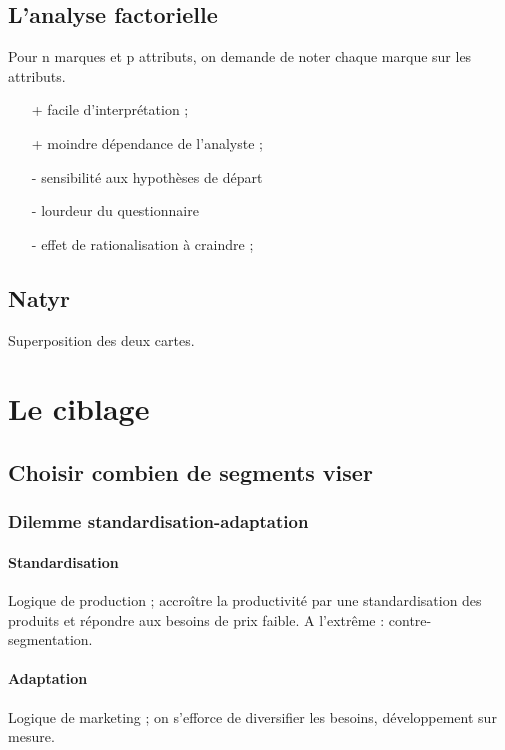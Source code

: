 		\subsection{L'analyse factorielle}
		
		Pour n marques et p attributs, on demande de noter chaque marque sur les attributs. 
		
		
		
		\begin{itemize}
			\item[+] facile d'interprétation ;
			\item[+] moindre dépendance de l'analyste ;
			\item[-] sensibilité aux hypothèses de départ
			\item[-] lourdeur du questionnaire
			\item[-] effet de rationalisation à craindre ;
		\end{itemize}
		
		\subsection{Natyr}
		
		Superposition des deux cartes.
		
		
	
	\section{Le ciblage}
	
	
		\subsection{Choisir combien de segments viser}
		
		
			\subsubsection{Dilemme standardisation-adaptation}
			
			\paragraph{Standardisation}
			Logique de production ; accroître la productivité par une standardisation des produits et répondre aux besoins de prix faible. A l'extrême : contre-segmentation. \\
			
			\paragraph{Adaptation}
			Logique de marketing ; on s'efforce de diversifier les besoins, développement sur mesure.
			
